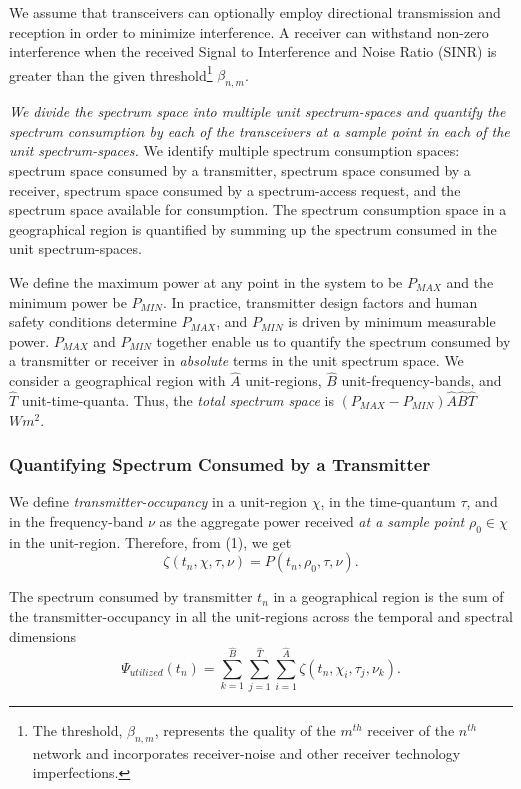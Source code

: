 \documentclass[12pt, draftclsnofoot, onecolumn]{IEEEtran}
\begin{document}
We assume that transceivers can optionally employ directional transmission and reception in order to minimize interference. A receiver can withstand non-zero interference when the received Signal to Interference and Noise Ratio (SINR) is greater than the given threshold\footnote{The threshold, $\beta_{n,m}$, represents the quality of the $m^{th}$ receiver of the $n^{th}$ network and incorporates receiver-noise and other receiver technology imperfections.} $\beta_{n,m}$. 

\textit{We divide the spectrum space into multiple unit spectrum-spaces and quantify the spectrum consumption by each of the transceivers at a sample point in each of the unit spectrum-spaces.} We identify multiple spectrum consumption spaces: spectrum space consumed by a transmitter, spectrum space consumed by a receiver, spectrum space consumed by a spectrum-access request, and the spectrum space available for consumption. The spectrum consumption space in a geographical region is quantified by summing up the spectrum consumed in the unit spectrum-spaces.

We define the maximum power at any point in the system to be $P_{MAX}$ and the minimum power be $P_{MIN}$. In practice, transmitter design factors and human safety conditions determine $P_{MAX}$, and $P_{MIN}$ is driven by minimum measurable power. $P_{MAX}$ and $P_{MIN}$ together enable us to quantify the spectrum consumed by a transmitter or receiver in \textit{absolute} terms in the unit spectrum space. We consider a geographical region with $\hat{A}$ unit-regions, $\hat{B}$ unit-frequency-bands, and $\hat{T}$ unit-time-quanta. Thus, the \textit{total spectrum space} is $(P_{MAX}-P_{MIN})\hat{A}\hat{B}\hat{T}$ \ $Wm^2$.

\subsubsection{Quantifying Spectrum Consumed by a Transmitter}
We define \textit{transmitter-occupancy} in a unit-region $\chi$, in the time-quantum ${\tau}$, and in the frequency-band $\nu$ as the aggregate power received \textit{at a sample point} $\rho_0 \in \chi$ in the unit-region. Therefore, from (1), we get 
\begin{equation}
\zeta(t_n, \chi, \tau, \nu) = P(t_n, \rho_{0}, \tau, \nu) .
\end{equation}

The spectrum consumed by transmitter $t_n$ in a geographical region is the sum of the transmitter-occupancy in all the unit-regions across the temporal and spectral dimensions
\begin{equation}
\label{eq:agsput}
\Psi_{utilized}(t_n) = \sum_{k=1}^{\hat{B}} \sum_{j=1}^{\hat{T}} \sum_{i=1}^{\hat{A}} {\zeta}(t_n, \chi_i, \tau_j, \nu_k) .
\end{equation}
\end{document}
